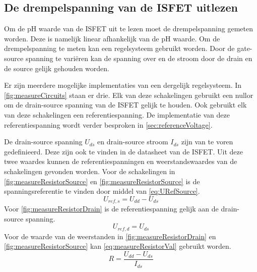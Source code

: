 \subsection{De drempelspanning van de ISFET uitlezen}

Om de pH waarde van de ISFET uit te lezen moet de drempelspanning gemeten worden. Deze is namelijk linear afhankelijk van de pH waarde.
Om de drempelspanning te meten kan een regelsysteem gebruikt worden. Door de gate-source spanning te variëren kan de spanning over en de stroom door de drain en de source gelijk gehouden worden.

Er zijn meerdere mogelijke implementaties van een dergelijk regelsysteem. In \autoref{fig:measureCircuits} staan er drie.
Elk van deze schakelingen gebruikt een nullor om de drain-source spanning van de ISFET gelijk te houden. Ook gebruikt elk van deze schakelingen een referentiespanning. De implementatie van deze referentiespanning wordt verder besproken in \autoref{sec:referenceVoltage}.

De drain-source spanning $U_{ds}$ en drain-source stroom $I_{ds}$ zijn van te voren gedefinieerd. Deze zijn ook te vinden in de datasheet van de ISFET\cite{isfet}. Uit deze twee waardes kunnen de referentiespanningen en weerstandswaardes van de schakelingen gevonden worden.
Voor de schakelingen in \autoref{fig:measureResistorSource} en \autoref{fig:measureResistorSource} is de spanningsreferentie te vinden door middel van \autoref{eq:URefSource}.
\begin{equation}\label{eq:URefSource}
    U_{ref,s} = U_{dd} - U_{ds}
\end{equation}
Voor \autoref{fig:measureResistorDrain} is de referentiespanning gelijk aan de drain-source spanning.
\begin{equation}\label{eq:URefDrain}
    U_{ref,d} = U_{ds}
\end{equation}
Voor de waarde van de weerstanden in \autoref{fig:measureResistorDrain} en \autoref{fig:measureResistorSource} kan \autoref{eq:measureResistorVal} gebruikt worden.
\begin{equation}\label{eq:measureResistorVal}
    R = \frac{U_{dd} - U_{ds}}{I_{ds}}
\end{equation}


